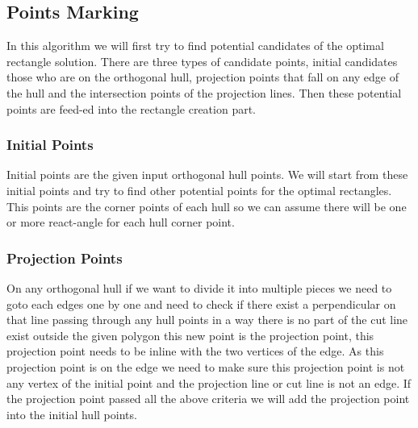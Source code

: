 \documentclass[a4paper,17pt]{article}
\begin{document}
\subsection{Points Marking} \label{sec:point-marking}
In this algorithm we will first try to find potential candidates of the optimal rectangle solution. There are three types of candidate points, initial candidates those who are on the orthogonal hull, projection points that fall on any edge of the hull and the intersection points of the projection lines. Then these potential points are feed-ed into the rectangle creation part.

\subsubsection{Initial Points}
Initial points are the given input orthogonal hull points. We will start from these initial points and try to find other potential points for the optimal rectangles. This points are the corner points of each hull so we can assume there will be one or more react-angle for each hull corner point.
\subsubsection{Projection Points}
On any orthogonal hull if we want to divide it into multiple pieces we need to goto each edges one by one and need to check if there exist a perpendicular on that line passing through any hull points in a way there is no part of the cut line exist outside the given polygon this new point is the projection point, this projection point needs to be inline with the two vertices of the edge. As this projection point is on the edge we need to make sure this projection point is not any vertex of the initial point and the projection line or cut line is not an edge. If the projection point passed all the above criteria we will add the projection point into the initial hull points.
\end{document}
